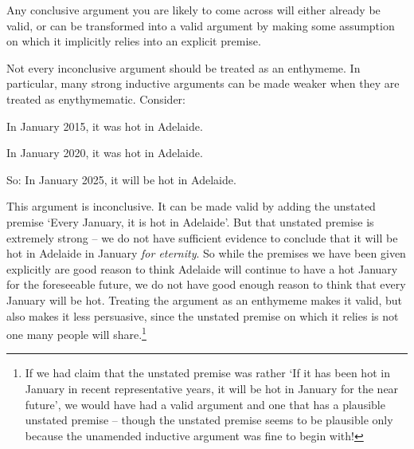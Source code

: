 	Any conclusive argument you are likely to come across will either already be valid, or can be transformed into a valid argument by making some assumption on which it implicitly relies into an explicit premise.

	Not every inconclusive argument should be treated as an enthymeme. In particular, many strong inductive arguments can be made weaker when they are treated as enythymematic. Consider:
	\begin{earg}
		\item[] In January 2015, it was hot in Adelaide.
		\item[] In January 2020, it was hot in Adelaide.
	\item[So:] In January 2025, it will be hot in Adelaide.
\end{earg} This argument is inconclusive. It can be made valid by adding the unstated premise `Every January, it is hot in Adelaide'. But that unstated premise is extremely strong – we do not have sufficient evidence to conclude that it will be hot in Adelaide in January \emph{for eternity}. So while the premises we have been given explicitly are good reason to think Adelaide will continue to have a hot January for the foreseeable future, we do not have good enough reason to think that every January will be hot. Treating the argument as an enthymeme makes it valid, but also makes it less persuasive, since the unstated premise on which it relies is not one many people will share.\footnote{If we had claim that the unstated premise was rather `If it has been hot in January in recent representative years, it will be hot in January for the near future', we would have had a valid argument and one that has a plausible unstated premise – though the unstated premise seems to be plausible only because the unamended inductive argument was fine to begin with!}


